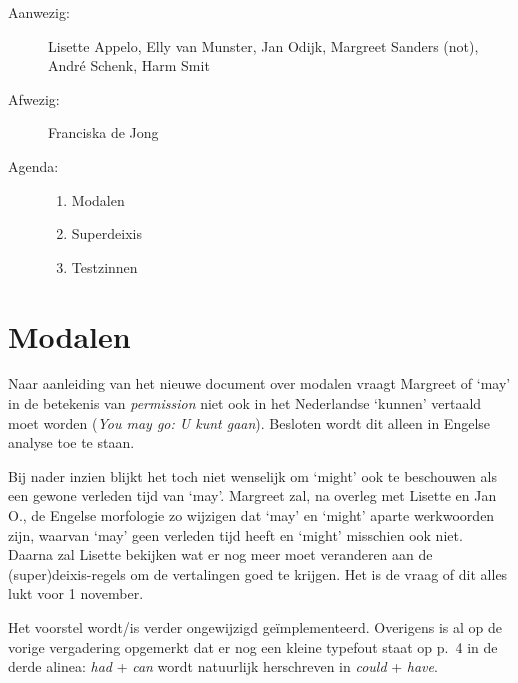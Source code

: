 

   \RosSupersedes{-}
   \MakeRosTitle
%
%
\begin{description}
\item[Aanwezig:] Lisette Appelo, Elly van Munster, Jan Odijk,
                 Margreet Sanders (not), Andr\'{e} Schenk, Harm Smit
\item[Afwezig:] Franciska de Jong
\item[Agenda:]\mbox{}
  \begin{enumerate}
  \item Modalen
  \item Superdeixis
  \item Testzinnen
  \end{enumerate}
\end{description}

\section{Modalen}
Naar aanleiding van het nieuwe document over modalen vraagt Margreet of `may' 
in de betekenis van {\em permission\/} niet ook in het Nederlandse `kunnen' 
vertaald moet worden ({\em You may go: U kunt gaan\/}). Besloten wordt dit 
alleen in Engelse analyse toe te staan.

Bij nader inzien blijkt het toch niet wenselijk om `might' ook te beschouwen als 
een gewone verleden tijd van `may'. Margreet zal, na overleg met Lisette en Jan 
O., de Engelse morfologie zo wijzigen dat `may' en `might' aparte werkwoorden 
zijn, waarvan `may' geen verleden tijd heeft en `might' misschien ook niet.
Daarna zal Lisette bekijken wat er nog meer moet veranderen aan de 
(super)deixis-regels om de vertalingen goed te krijgen. Het is de vraag of dit 
alles lukt voor 1 november.

Het voorstel wordt/is verder ongewijzigd ge\"{i}mplementeerd. Overigens is al 
op de vorige vergadering opgemerkt dat er nog een kleine typefout staat op 
p.\ 4 in de 
derde alinea: {\em had\/} + {\em can\/} wordt natuurlijk herschreven in {\em 
could\/} + {\em have\/}.

